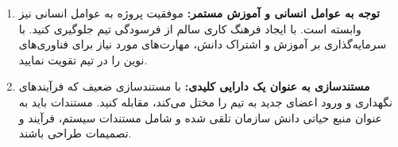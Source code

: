 \begin{enumerate}
\begin{itemize}
    \end{itemize}
    \item \textbf{توجه به عوامل انسانی و آموزش مستمر:} موفقیت پروژه به عوامل انسانی نیز وابسته است. با ایجاد فرهنگ کاری سالم از فرسودگی تیم جلوگیری کنید. با سرمایه‌گذاری بر آموزش و اشتراک دانش، مهارت‌های مورد نیاز برای فناوری‌های نوین را در تیم تقویت نمایید.
    \item \textbf{مستندسازی به عنوان یک دارایی کلیدی:} با مستندسازی ضعیف که فرآیندهای نگهداری و ورود اعضای جدید به تیم را مختل می‌کند، مقابله کنید. مستندات باید به عنوان منبع حیاتی دانش سازمان تلقی شده و شامل مستندات سیستم، فرآیند و تصمیمات طراحی باشند.
\end{enumerate}
